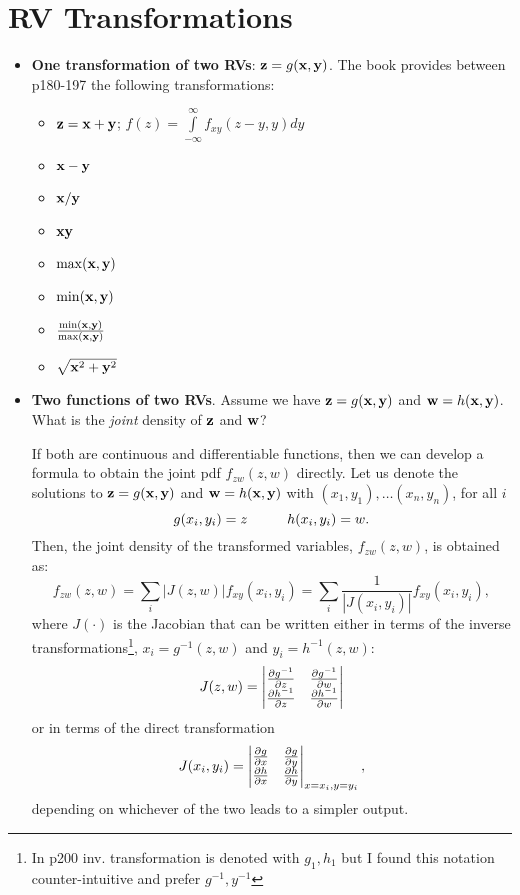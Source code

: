 \documentclass[a4paper, oneside]{book}
\begin{document}
\section{RV Transformations}
\label{sec:two_rv_transformations}
\begin{itemize}
\item \textbf{One transformation of two RVs}: $\mathbf z = g(\mathbf{x,y})$. The book provides between p180-197 the following transformations:
	\begin{itemize}
	\item $\mathbf z = \mathbf{x+y}$; $f(z) = \int\limits_{-\infty}^\infty f_{xy}(z-y, y)dy$
	\item $\mathbf{x-y}$
	\item $\mathbf{x/y}$
	\item $\mathbf{xy}$
	\item $\max(\mathbf{x,y})$
	\item $\min(\mathbf{x,y})$
	\item $\frac{\min(\mathbf{x,y})}{\max(\mathbf{x,y})}$
	\item $\sqrt{\mathbf x^2 + \mathbf y^2}$
	\end{itemize}
\item \textbf{Two functions of two RVs}. Assume we have $\mathbf z = g(\mathbf{x,y})$ and $\mathbf w  = h(\mathbf{x,y})$. What is the \textit{joint} density of $\mathbf z$ and $\mathbf w$?

If both are continuous and differentiable functions, then we can develop a formula to obtain the joint pdf $f_{zw} (z,w)$ directly. Let us denote the solutions to $\mathbf z = g(\mathbf{x,y})$ and $\mathbf w  = h(\mathbf{x,y})$ with $(x_1,y_1), \hdots (x_n,y_n)$, \ie for all $i$%
$$g(x_i,y_i) = z\hspace{1truecm} h(x_i,y_i) = w.$$
%
Then, the joint density of the transformed variables, $f_{zw}(z,w)$, is obtained as:%
$$f_{zw}(z,w) = \sum_{i}|J(z,w)|f_{xy}(x_i,y_i) = \sum_{i}\frac{1}{|J(x_i,y_i)|}f_{xy}(x_i,y_i),$$
where $J(\cdot)$ is the Jacobian that can be written either in terms of the inverse transformations\footnote{In p200 inv. transformation is denoted with $g_1,h_1$ but I found this notation counter-intuitive and prefer $g^{-1}, y^{-1}$}, $x_i = g^{-1}(z,w)$ and $y_i = h^{-1}(z,w)$:
\begin{equation}
J(z,w) = \left| \begin{matrix}
\frac{\partial g^{-1}}{\partial z} & \frac{\partial g^{-1}}{\partial w} \\
\frac{\partial h^{-1}}{\partial z} & \frac{\partial h^{-1}}{\partial w}
\end{matrix} \right|
\label{eq:j_inverse}
\end{equation}
%
or in terms of the direct transformation
%
\begin{equation}
J(x_i,y_i) = \left| \begin{matrix}
\frac{\partial g}{\partial x} & \frac{\partial g}{\partial y} \\
\frac{\partial h}{\partial x} & \frac{\partial h}{\partial y}
\end{matrix} \right|_{x=x_i,y=y_i},
\label{eq:j_direct}
\end{equation}
depending on whichever of the two leads to a simpler output.


\end{itemize}
\end{document}
